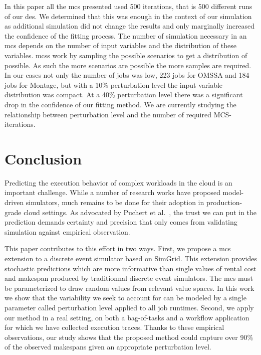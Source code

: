 \documentclass[10pt,conference,compsocconf]{IEEEtran}
\begin{document}
In this paper all the \ac{mcs} presented used 500 iterations, that is 500
different runs of our \ac{des}. We determined that this was enough in the
context of our simulation as additional simulation did not change the results
and only marginally increased the confidence of the fitting process. The number
of simulation necessary in an \ac{mcs} depends on the number of input variables
and the distribution of these variables. \aclp{mcs} work by sampling the possible
scenarios to get a distribution of possible. As such the more scenarios are
possible the more samples are required. In our cases not only the number of jobs
was low, 223 jobs for OMSSA and 184 jobs for Montage, but with a 10\%
perturbation level the input variable distribution was compact. At a 40\%
perturbation level there was a significant drop in the confidence of our fitting
method. We are currently studying the relationship between perturbation level
and the number of required MCS-iterations.

\section{Conclusion}
Predicting  the execution  behavior  of complex  workloads in  the  cloud is  an
important challenge. While a number of research works have proposed model-driven
simulators, much remains to be done for their adoption in production-grade cloud
settings. As  advocated by Puchert  et al.~\cite{PucherGWK15}, the trust  we can
put in  the prediction  demands certainty  and precision  that only  comes from
validating simulation against empirical observation.

This paper contributes to this effort in two ways. First, we propose a \acl{mcs}
extension  to a  discrete  event  simulator based  on  SimGrid.  This  extension
provides stochastic predictions which are more informative than single values of
rental cost  and makespan  produced by  traditionnal discrete  event simulators.
The \acl{mcs}  must be parameterized to  draw random values from  relevant value
spaces. In this work we show that the  variability we seek to account for can be
modeled  by a  single parameter  called perturbation  level applied  to all  job
runtimes. Second, we apply our method in  a real setting, on both a bag-of-tasks
and a workflow application for which we have collected execution traces.  Thanks
to these empirical observations, our study  shows that the proposed method could
capture over  90\% of the  observed makespans given an  appropriate perturbation
level.
\end{document}

